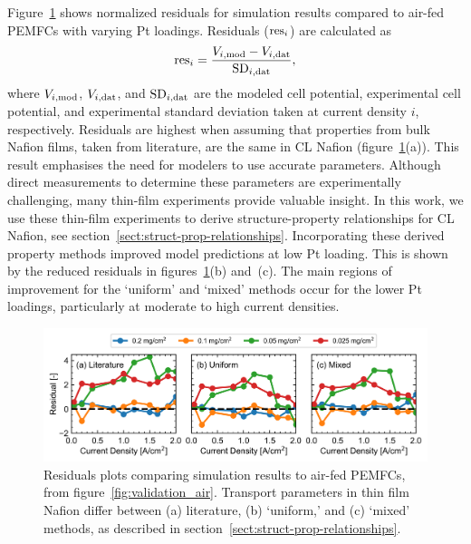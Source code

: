 \documentclass[final,3p,times,onecolumn]{elsarticle}    %
\newcommand{\crr}[1]{\color{red} #1 \color{black}} %
\begin{document}
\crr{Figure~\ref{fig:residuals-air} shows normalized residuals for simulation results compared to air-fed PEMFCs with varying Pt loadings. Residuals (${\rm res}_i$) are calculated as
\begin{equation}
    {\rm res}_i = \frac{V_{i, \rm mod} - V_{i, \rm dat}}{{\rm SD}_{i, \rm dat}},
\end{equation}
where $V_{i, \rm mod}$, $V_{i, \rm dat}$, and ${\rm SD}_{i, \rm dat}$ are the modeled cell potential, experimental cell potential, and experimental standard deviation taken at current density $i$, respectively. Residuals are highest when assuming that properties from bulk Nafion films, taken from literature, are the same in CL Nafion (figure~\ref{fig:residuals-air}(a)). This result emphasises the need for modelers to use accurate parameters. Although direct measurements to determine these parameters are experimentally challenging, many thin-film experiments provide valuable insight. In this work, we use these thin-film experiments to derive structure-property relationships for CL Nafion, see section~\ref{sect:struct-prop-relationships}. Incorporating these derived property methods improved model predictions at low Pt loading. This is shown by the reduced residuals in figures~\ref{fig:residuals-air}(b) and~(c). The main regions of improvement for the `uniform' and `mixed' methods occur for the lower Pt loadings, particularly at moderate to high current densities.}
\begin{figure}[!t]
    \centering
    \includegraphics[width=6.436in]{figures/residuals-air-6_436in.png}
    \crr{\caption{Residuals plots comparing simulation results to air-fed PEMFCs, from figure~\ref{fig:validation_air}. Transport parameters in thin film Nafion differ between (a) literature, (b) `uniform,' and (c) `mixed' methods, as described in section~\ref{sect:struct-prop-relationships}.}}
    \label{fig:residuals-air}
\end{figure}
\end{document}
